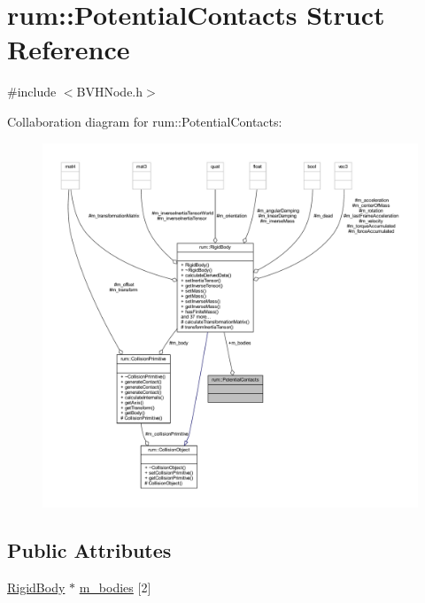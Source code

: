 \hypertarget{structrum_1_1_potential_contacts}{}\section{rum\+:\+:Potential\+Contacts Struct Reference}
\label{structrum_1_1_potential_contacts}


{\ttfamily \#include $<$B\+V\+H\+Node.\+h$>$}



Collaboration diagram for rum\+:\+:Potential\+Contacts\+:\nopagebreak
\begin{figure}[H]
\begin{center}
\leavevmode
\includegraphics[width=350pt]{structrum_1_1_potential_contacts__coll__graph}
\end{center}
\end{figure}
\subsection*{Public Attributes}
\begin{DoxyCompactItemize}
\item 
\mbox{\hyperlink{classrum_1_1_rigid_body}{Rigid\+Body}} $\ast$ \mbox{\hyperlink{structrum_1_1_potential_contacts_a6c7a15f406ed9bbaeb776bf40e9b15d2}{m\+\_\+bodies}} \mbox{[}2\mbox{]}
\end{DoxyCompactItemize}



